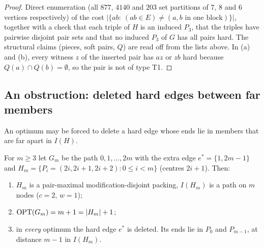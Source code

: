 \begin{proof}
Direct enumeration (all $877$, $4140$ and $203$ set partitions of $7$, $8$ and $6$ vertices respectively) of the cost $|\{ab:\ (ab\in E)\neq(a,b\text{ in one block})\}|$, together with a check that each triple of $H$ is an induced $P_3$, that the triples have pairwise disjoint pair sets and that no induced $P_3$ of $G$ has all pairs hard. The structural claims (pieces, soft pairs, $Q$) are read off from the lists above. In (a) and (b), every witness $z$ of the inserted pair has $az$ or $zb$ hard because $Q(a)\cap Q(b)=\emptyset$, so the pair is not of type T1.
\end{proof}

\subsection{An obstruction: deleted hard edges between far members}
An optimum may be forced to delete a hard edge whose ends lie in members that are far apart in $I(H)$.
\begin{proposition}[FAR]\label{prop:FAR}
For $m\ge3$ let $G_m$ be the path $0,1,\dots,2m$ with the extra edge $e^*=\{1,2m-1\}$ and $H_m=\{P_i=(2i,2i+1,2i+2):0\le i<m\}$ (centres $2i+1$). Then:
\begin{enumerate}
\item[(i)] $H_m$ is a pair-maximal modification-disjoint packing, $I(H_m)$ is a path on $m$ nodes ($c=2$, $w=1$);
\item[(ii)] $\mathrm{OPT}(G_m)=m+1=|H_m|+1$;
\item[(iii)] in \emph{every} optimum the hard edge $e^*$ is deleted. Its ends lie in $P_0$ and $P_{m-1}$, at distance $m-1$ in $I(H_m)$.
\end{enumerate}
\end{proposition}
